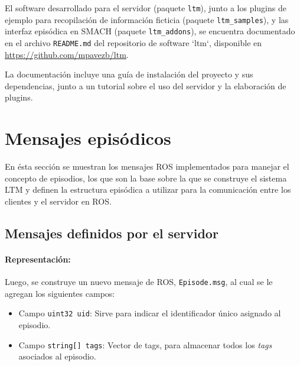 El software desarrollado para el servidor (paquete \texttt{ltm}), junto a los plugins de ejemplo para recopilación de información ficticia (paquete \texttt{ltm\_samples}), y las interfaz episódica en SMACH (paquete \texttt{ltm\_addons}), se encuentra documentado en el archivo \texttt{README.md} del repositorio de software `ltm`, disponible en  \url{https://github.com/mpavezb/ltm}.

La documentación incluye una guía de instalación del proyecto y sus dependencias, junto a un tutorial sobre el uso del servidor y la elaboración de plugins.



\section{Mensajes episódicos}

En ésta sección se muestran los mensajes ROS implementados para manejar el concepto de episodios, los que son la base sobre la que se construye el sistema LTM y definen la estructura episódica a utilizar para la comunicación entre los clientes y el servidor en ROS.

\subsection{Mensajes definidos por el servidor}

\paragraph{Representación:}
Luego, se construye un nuevo mensaje de ROS, \texttt{Episode.msg}, al cual se le agregan los siguientes campos:
\begin{itemize}
	\item Campo \texttt{uint32 uid}: Sirve para indicar el identificador único asignado al episodio.
	\item Campo \texttt{string[] tags}: Vector de tags, para almacenar todos los \textit{tags} asociados al episodio.
\end{itemize}

